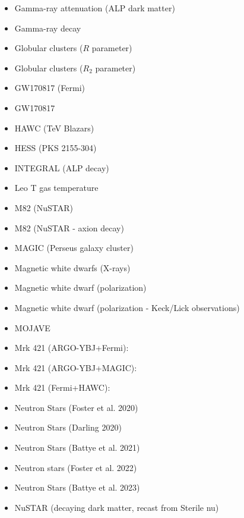 \documentclass[8pt,twocolumn]{extarticle}
\begin{document}
\begin{mdframed}[everyline=true]
\begin{itemize}
   	\item Gamma-ray attenuation (ALP dark matter)~\cite{Bernal:2022xyi}
   	\item Gamma-ray decay~\cite{Sun:2023acy}
    \item Globular clusters ($R$ parameter)~\cite{Ayala:2014pea}
    \item Globular clusters ($R_2$ parameter)~\cite{Dolan:2022kul}
    \item GW170817 (Fermi)~\cite{Dev:2023hax}
    \item GW170817 ~\cite{Diamond:2023cto}
    \item HAWC (TeV Blazars)~\cite{Jacobsen:2022swa}
    \item HESS (PKS 2155-304)~\cite{HESS:2013udx}
    \item INTEGRAL (ALP decay)~\cite{Calore:2022pks}
    \item Leo T gas temperature~\cite{Wadekar:2021qae}
    \item M82 (NuSTAR)~\cite{Ning:2024eky}
    \item M82 (NuSTAR - axion decay)~\cite{Candon:2024eah}
    \item MAGIC (Perseus galaxy cluster)~\cite{MAGIC:2024arq}
    \item Magnetic white dwarfs (X-rays)~\cite{Dessert:2021bkv}
    \item Magnetic white dwarf (polarization)~\cite{Dessert:2022yqq}
    \item Magnetic white dwarf (polarization - Keck/Lick observations)~\cite{Benabou:2025jcv}
    \item MOJAVE~\cite{Ivanov:2018byi}
    \item Mrk 421 (ARGO-YBJ+Fermi):~\cite{Li:2020pcn}
    \item Mrk 421 (ARGO-YBJ+MAGIC):~\cite{Li:2021gxs}
    \item Mrk 421 (Fermi+HAWC):~\cite{Li:2024zst}
    \item Neutron Stars (Foster et al. 2020)~\cite{Foster:2020pgt}
    \item Neutron Stars (Darling 2020)~\cite{Darling:2020uyo}
    \item Neutron Stars (Battye et al. 2021)~\cite{Battye:2021yue}
    \item Neutron stars (Foster et al. 2022)~\cite{Foster:2022fxn}
    \item Neutron Stars (Battye et al. 2023)~\cite{Battye:2023oac}
    \item NuSTAR (decaying dark matter, recast from Sterile nu)~\cite{Perez:2016tcq,Ng:2019gch,Roach:2022lgo}

\end{itemize}
\end{mdframed}
\end{document}
